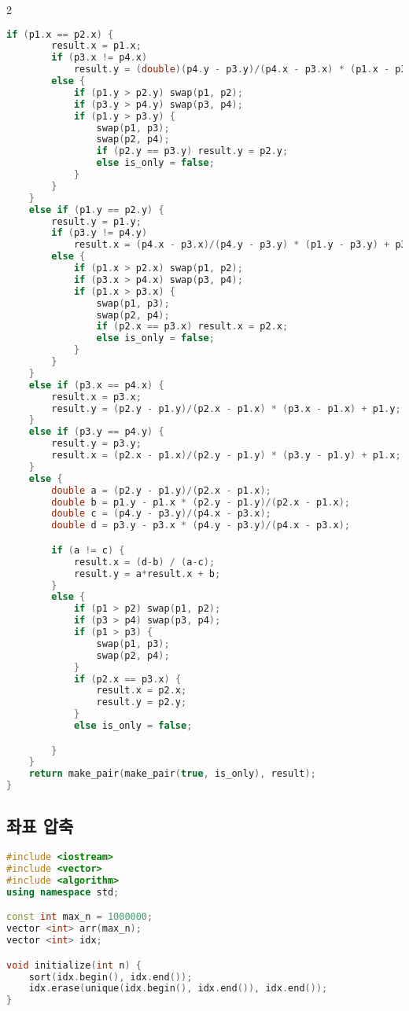 \documentclass[]{article}
\begin{document}
\begin{multicols*}{2}
\begin{lstlisting}[language=c++]
    if (p1.x == p2.x) {
        result.x = p1.x;
        if (p3.x != p4.x)
            result.y = (double)(p4.y - p3.y)/(p4.x - p3.x) * (p1.x - p3.x) + p3.y;
        else {
            if (p1.y > p2.y) swap(p1, p2);
            if (p3.y > p4.y) swap(p3, p4);
            if (p1.y > p3.y) {
                swap(p1, p3);
                swap(p2, p4);
                if (p2.y == p3.y) result.y = p2.y;
                else is_only = false;
            }
        }
    }
    else if (p1.y == p2.y) {
        result.y = p1.y;
        if (p3.y != p4.y)
            result.x = (p4.x - p3.x)/(p4.y - p3.y) * (p1.y - p3.y) + p3.x;
        else {
            if (p1.x > p2.x) swap(p1, p2);
            if (p3.x > p4.x) swap(p3, p4);
            if (p1.x > p3.x) {
                swap(p1, p3);
                swap(p2, p4);
                if (p2.x == p3.x) result.x = p2.x;
                else is_only = false;
            }
        }
    }
    else if (p3.x == p4.x) {
        result.x = p3.x;
        result.y = (p2.y - p1.y)/(p2.x - p1.x) * (p3.x - p1.x) + p1.y;
    }
    else if (p3.y == p4.y) {
        result.y = p3.y;
        result.x = (p2.x - p1.x)/(p2.y - p1.y) * (p3.y - p1.y) + p1.x;
    }
    else {
        double a = (p2.y - p1.y)/(p2.x - p1.x);
        double b = p1.y - p1.x * (p2.y - p1.y)/(p2.x - p1.x);
        double c = (p4.y - p3.y)/(p4.x - p3.x);
        double d = p3.y - p3.x * (p4.y - p3.y)/(p4.x - p3.x);

        if (a != c) {
            result.x = (d-b) / (a-c);
            result.y = a*result.x + b;
        }
        else {
            if (p1 > p2) swap(p1, p2);
            if (p3 > p4) swap(p3, p4);
            if (p1 > p3) {
                swap(p1, p3);
                swap(p2, p4);
            }
            if (p2.x == p3.x) {
                result.x = p2.x;
                result.y = p2.y;
            }
            else is_only = false;

        }
    }
    return make_pair(make_pair(true, is_only), result);
}
\end{lstlisting}
\subsection{좌표 압축}
\begin{lstlisting}[language=c++]
#include <iostream>
#include <vector>
#include <algorithm>
using namespace std;

const int max_n = 1000000;
vector <int> arr(max_n);
vector <int> idx;

void initialize(int n) {
    sort(idx.begin(), idx.end());
    idx.erase(unique(idx.begin(), idx.end()), idx.end());
}


\end{lstlisting}
\end{multicols*}
\end{document}
